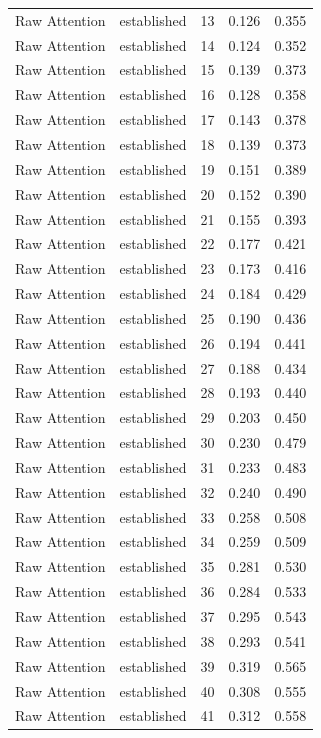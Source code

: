 \begin{tabular}{llrrr}
Raw Attention & established & 13 & 0.126 & 0.355 \\
Raw Attention & established & 14 & 0.124 & 0.352 \\
Raw Attention & established & 15 & 0.139 & 0.373 \\
Raw Attention & established & 16 & 0.128 & 0.358 \\
Raw Attention & established & 17 & 0.143 & 0.378 \\
Raw Attention & established & 18 & 0.139 & 0.373 \\
Raw Attention & established & 19 & 0.151 & 0.389 \\
Raw Attention & established & 20 & 0.152 & 0.390 \\
Raw Attention & established & 21 & 0.155 & 0.393 \\
Raw Attention & established & 22 & 0.177 & 0.421 \\
Raw Attention & established & 23 & 0.173 & 0.416 \\
Raw Attention & established & 24 & 0.184 & 0.429 \\
Raw Attention & established & 25 & 0.190 & 0.436 \\
Raw Attention & established & 26 & 0.194 & 0.441 \\
Raw Attention & established & 27 & 0.188 & 0.434 \\
Raw Attention & established & 28 & 0.193 & 0.440 \\
Raw Attention & established & 29 & 0.203 & 0.450 \\
Raw Attention & established & 30 & 0.230 & 0.479 \\
Raw Attention & established & 31 & 0.233 & 0.483 \\
Raw Attention & established & 32 & 0.240 & 0.490 \\
Raw Attention & established & 33 & 0.258 & 0.508 \\
Raw Attention & established & 34 & 0.259 & 0.509 \\
Raw Attention & established & 35 & 0.281 & 0.530 \\
Raw Attention & established & 36 & 0.284 & 0.533 \\
Raw Attention & established & 37 & 0.295 & 0.543 \\
Raw Attention & established & 38 & 0.293 & 0.541 \\
Raw Attention & established & 39 & 0.319 & 0.565 \\
Raw Attention & established & 40 & 0.308 & 0.555 \\
Raw Attention & established & 41 & 0.312 & 0.558 \\

\end{tabular}
